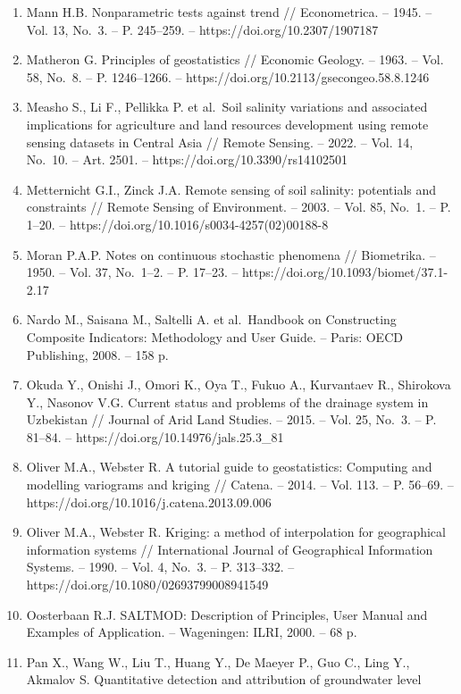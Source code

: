 \begin{enumerate}
\item
  Mann H.B. Nonparametric tests against trend // Econometrica. -- 1945.
  -- Vol. 13, No.~3. -- P. 245--259. -- https://doi.org/10.2307/1907187
\item
  Matheron G. Principles of geostatistics // Economic Geology. -- 1963.
  -- Vol. 58, No.~8. -- P. 1246--1266. --
  https://doi.org/10.2113/gsecongeo.58.8.1246
\item
  Measho S., Li F., Pellikka P. et al.~Soil salinity variations and
  associated implications for agriculture and land resources development
  using remote sensing datasets in Central Asia // Remote Sensing. --
  2022. -- Vol. 14, No.~10. -- Art. 2501. --
  https://doi.org/10.3390/rs14102501
\item
  Metternicht G.I., Zinck J.A. Remote sensing of soil salinity:
  potentials and constraints // Remote Sensing of Environment. -- 2003.
  -- Vol. 85, No.~1. -- P. 1--20. --
  https://doi.org/10.1016/s0034-4257(02)00188-8
\item
  Moran P.A.P. Notes on continuous stochastic phenomena // Biometrika.
  -- 1950. -- Vol. 37, No.~1--2. -- P. 17--23. --
  https://doi.org/10.1093/biomet/37.1-2.17
\item
  Nardo M., Saisana M., Saltelli A. et al.~Handbook on Constructing
  Composite Indicators: Methodology and User Guide. -- Paris: OECD
  Publishing, 2008. -- 158 p.
\item
  Okuda Y., Onishi J., Omori K., Oya T., Fukuo A., Kurvantaev R.,
  Shirokova Y., Nasonov V.G. Current status and problems of the drainage
  system in Uzbekistan // Journal of Arid Land Studies. -- 2015. -- Vol.
  25, No.~3. -- P. 81--84. -- https://doi.org/10.14976/jals.25.3\_81
\item
  Oliver M.A., Webster R. A tutorial guide to geostatistics: Computing
  and modelling variograms and kriging // Catena. -- 2014. -- Vol. 113.
  -- P. 56--69. -- https://doi.org/10.1016/j.catena.2013.09.006
\item
  Oliver M.A., Webster R. Kriging: a method of interpolation for
  geographical information systems // International Journal of
  Geographical Information Systems. -- 1990. -- Vol. 4, No.~3. -- P.
  313--332. -- https://doi.org/10.1080/02693799008941549
\item
  Oosterbaan R.J. SALTMOD: Description of Principles, User Manual and
  Examples of Application. -- Wageningen: ILRI, 2000. -- 68 p.
\item
  Pan X., Wang W., Liu T., Huang Y., De Maeyer P., Guo C., Ling Y.,
  Akmalov S. Quantitative detection and attribution of groundwater level

\end{enumerate}
